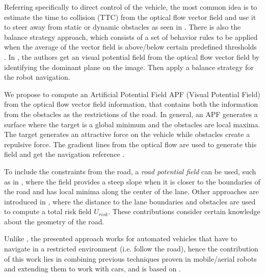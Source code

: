 \documentclass[letterpaper, 10 pt, conference]{ieeeconf}  %
\begin{document}
Referring specifically to direct control of the vehicle, the most common idea is to estimate the time to collision (TTC) from the optical flow vector field and use it to steer away from static or dynamic obstacles as seen in \cite{camus1995calculating}. There is also the balance strategy approach, which consists of a set of behavior rules to be applied when the average of the vector field is above/below certain predefined thresholds \cite{souhila2007optical,chang2016experimental}. In \cite{ohnishi2008visual}, the authors get an visual potential field from the optical flow vector field by identifying the dominant plane on the image. Then apply a balance strategy for the robot navigation. 

We propose to compute an Artificial Potential Field APF (Visual Potential Field) from the optical flow vector field information, that contains both the information from the obstacles as the restrictions of the road. In general, an APF  generates a surface where the target is a global minimum and the obstacles are local maxima. The target generates an attractive force on the vehicle while obstacles create a repulsive force. The gradient lines from the optical flow are used to generate this field and get the navigation reference \cite{guldner1995tracking,ferrara2007gradient}.

To include the constraints from the road, a \textit{road potential field} can be used, such as in \cite{snapper2018model}, where the field provides a steep slope when it is closer to the boundaries of the road and has local minima along the center of the lane. Other approaches are introduced in \cite{hamid2018,raksincharoensak2016vehicle}, where the distance to the lane boundaries and obstacles are used to compute a total risk field $U_{risk}$. These contributions consider certain knowledge about the geometry of the road.


Unlike \cite{ohnishi2008visual,miao2017optical}, the presented approach works for automated vehicles that have to navigate in a restricted environment (i.e. follow the road), hence the contribution of this work lies in combining previous techniques proven in mobile/aerial robots and extending them to work with cars, and is based on \cite{capito2019optical}.
\end{document}
